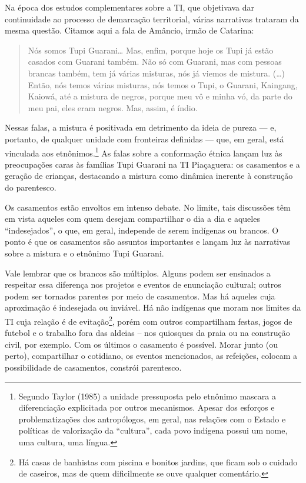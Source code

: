 Na época dos estudos complementares sobre a TI, que objetivava dar
continuidade ao processo de demarcação territorial, várias narrativas
trataram da mesma questão. Citamos aqui a fala de Amâncio, irmão de
Catarina:

\begin{quotation}
Nós somos Tupi Guarani\ldots{} Mas, enfim, porque hoje os Tupi já estão
casados com Guarani também. Não só com Guarani, mas com pessoas brancas
também, tem já várias misturas, nós já viemos de mistura. (\ldots{}) Então,
nós temos várias misturas, nós temos o Tupi, o Guarani, Kaingang,
Kaiowá, até a mistura de negros, porque meu vô e minha vó, da parte do
meu pai, eles eram negros. Mas, assim, é índio.
\end{quotation} 

Nessas falas, a mistura é positivada em detrimento da ideia de pureza —
e, portanto, de qualquer unidade com fronteiras definidas — que, em
geral, está vinculada aos etnônimos.\footnote{Segundo Taylor (1985) a
unidade pressuposta pelo etnônimo mascara a diferenciação explicitada
por outros mecanismos. Apesar dos esforços e problematizações dos
antropólogos, em geral, nas relações com o Estado e políticas de
valorização da ``cultura'', cada povo indígena possui um nome, uma
cultura, uma língua.} As falas sobre a conformação étnica lançam luz
às preocupações caras às famílias Tupi Guarani na TI Piaçaguera: os
casamentos e a geração de crianças, destacando a mistura como dinâmica
inerente à construção do parentesco.

Os casamentos estão envoltos em intenso debate. No limite, tais
discussões têm em vista aqueles com quem desejam compartilhar o dia a
dia e aqueles ``indesejados'', o que, em geral, independe de serem
indígenas ou brancos. O ponto é que os casamentos são assuntos
importantes e lançam luz às narrativas sobre a mistura e o etnônimo
Tupi Guarani.

Vale lembrar que os brancos são múltiplos. Alguns podem ser ensinados a
respeitar essa diferença nos projetos e eventos de enunciação cultural;
outros podem ser tornados parentes por meio de casamentos. Mas há
aqueles cuja aproximação é indesejada ou inviável. Há não indígenas que
moram nos limites da TI cuja relação é de evitação\footnote{Há casas de
banhistas com piscina e bonitos jardins, que ficam sob o cuidado de
caseiros, mas de quem dificilmente se ouve qualquer comentário.}, porém
com outros compartilham festas, jogos de futebol e o trabalho fora das
aldeias – nos quiosques da praia ou na construção civil, por exemplo.
Com os últimos o casamento é possível. Morar junto (ou perto),
compartilhar o cotidiano, os eventos mencionados, as refeições, colocam
a possibilidade de casamentos, constrói parentesco. 

